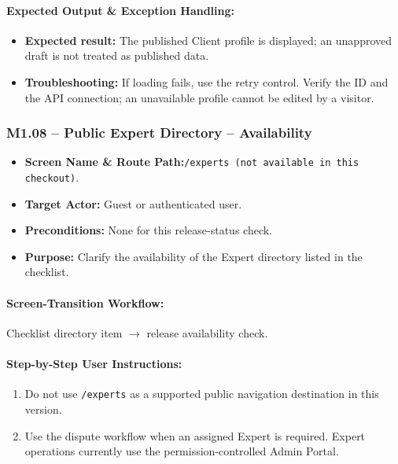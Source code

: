 \paragraph{Expected Output \& Exception Handling:}
\begin{itemize}[leftmargin=1.5em,itemsep=2pt]
  \item \textbf{Expected result:} The published Client profile is displayed; an unapproved draft is not treated as published data.
  \item \textbf{Troubleshooting:} If loading fails, use the retry control. Verify the ID and the API connection; an unavailable profile cannot be edited by a visitor.
\end{itemize}

\newpage
\subsubsection{M1.08 -- Public Expert Directory -- Availability}
\begin{itemize}[leftmargin=1.5em,itemsep=2pt]
  \item \textbf{Screen Name \& Route Path:}\newline \texttt{/experts (not available in this checkout)}.
  \item \textbf{Target Actor:} Guest or authenticated user.
  \item \textbf{Preconditions:} None for this release-status check.
  \item \textbf{Purpose:} Clarify the availability of the Expert directory listed in the checklist.
\end{itemize}
\paragraph{Screen-Transition Workflow:} Checklist directory item $\rightarrow$ release availability check.
\paragraph{Step-by-Step User Instructions:}
\begin{enumerate}[leftmargin=1.8em,itemsep=3pt]
  \item {} Do not use \texttt{/experts} as a supported public navigation destination in this version.
  \item {} Use the dispute workflow when an assigned Expert is required. Expert operations currently use the permission-controlled Admin Portal.
\end{enumerate}
